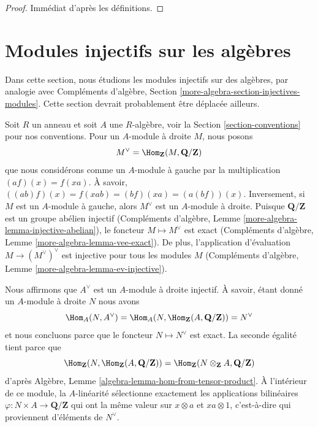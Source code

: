 \begin{proof}
Immédiat d'après les définitions.
\end{proof}







\section{Modules injectifs sur les algèbres}
\label{section-modules-noncommutative}

\noindent
Dans cette section, nous étudions les modules injectifs sur des algèbres,
par analogie avec Compléments d'algèbre, Section
\ref{more-algebra-section-injectives-modules}. Cette section devrait probablement
être déplacée ailleurs.

\medskip\noindent
Soit $R$ un anneau et soit $A$ une $R$-algèbre, voir la Section
\ref{section-conventions} pour nos conventions. Pour un $A$-module à droite $M$,
nous posons
$$
M^\vee = \Hom_\mathbf{Z}(M, \mathbf{Q}/\mathbf{Z})
$$
que nous considérons comme un $A$-module à gauche par la multiplication $(a f)(x)
= f(xa)$. À savoir, $((ab)f)(x) = f(xab) = (bf)(xa) = (a(bf))(x)$. Inversement, si
$M$ est un $A$-module à gauche, alors $M^\vee$ est un $A$-module à droite. Puisque
$\mathbf{Q}/\mathbf{Z}$ est un groupe abélien injectif (Compléments d'algèbre, Lemme
\ref{more-algebra-lemma-injective-abelian}), le foncteur $M \mapsto M^\vee$ est
exact (Compléments d'algèbre, Lemme \ref{more-algebra-lemma-vee-exact}). De plus,
l'application d'évaluation $M \to (M^\vee)^\vee$ est injective pour tous les
modules $M$ (Compléments d'algèbre, Lemme \ref{more-algebra-lemma-ev-injective}).

\medskip\noindent
Nous affirmons que $A^\vee$ est un $A$-module à droite injectif. À savoir, étant
donné un $A$-module à droite $N$ nous avons
$$
\Hom_A(N, A^\vee) =
\Hom_A(N, \Hom_\mathbf{Z}(A, \mathbf{Q}/\mathbf{Z})) = N^\vee
$$
et nous concluons parce que le foncteur $N \mapsto N^\vee$ est exact. La seconde
égalité tient parce que
$$
\Hom_\mathbf{Z}(N, \Hom_\mathbf{Z}(A, \mathbf{Q}/\mathbf{Z})) =
\Hom_\mathbf{Z}(N \otimes_\mathbf{Z} A, \mathbf{Q}/\mathbf{Z})
$$
d'après Algèbre, Lemme \ref{algebra-lemma-hom-from-tensor-product}. À l'intérieur de
ce module, la $A$-linéarité sélectionne exactement les applications bilinéaires
$\varphi : N \times A \to \mathbf{Q}/\mathbf{Z}$ qui ont la même valeur sur $x
\otimes a$ et $xa \otimes 1$, c'est-à-dire qui proviennent d'éléments de $N^\vee$.

